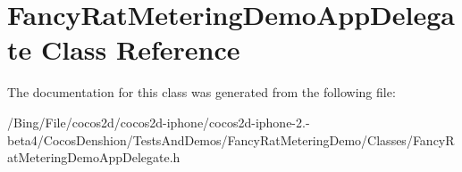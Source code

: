 \hypertarget{interface_fancy_rat_metering_demo_app_delegate}{\section{Fancy\-Rat\-Metering\-Demo\-App\-Delegate Class Reference}
\label{interface_fancy_rat_metering_demo_app_delegate}
}


The documentation for this class was generated from the following file\-:\begin{DoxyCompactItemize}
\item 
/\-Bing/\-File/cocos2d/cocos2d-\/iphone/cocos2d-\/iphone-\/2.-\/beta4/\-Cocos\-Denshion/\-Tests\-And\-Demos/\-Fancy\-Rat\-Metering\-Demo/\-Classes/Fancy\-Rat\-Metering\-Demo\-App\-Delegate.\-h\end{DoxyCompactItemize}
